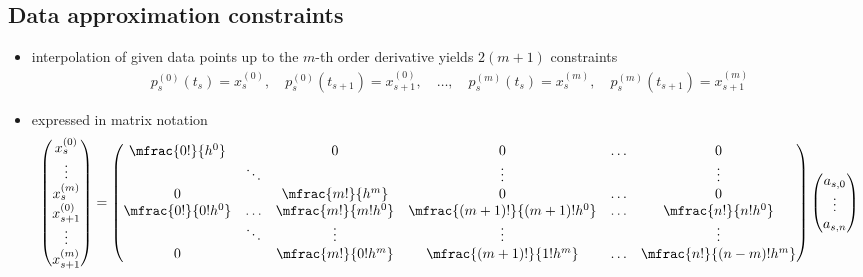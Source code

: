 \documentclass[11pt, a4paper]{article}
\begin{document}
\subsection*{Data approximation constraints}
\begin{itemize}
	\item interpolation of given data points up to the $m$-th order derivative yields ${2(m+1)}$ constraints
		\begin{align}
			p_s^{(0)}(t_s)=x_s^{(0)},\quad p_s^{(0)}(t_{s+1})=x_{s+1}^{(0)},\quad\ldots,\quad p_s^{(m)}(t_s)=x_s^{(m)},\quad p_s^{(m)}(t_{s+1})=x_{s+1}^{(m)}
		\end{align}
	\item expressed in matrix notation
		\begin{align}
			\begin{pmatrix}
				x_s^{(0)}\\
				\vdots\\
				x_s^{(m)}\\
				x_{s+1}^{(0)}\\
				\vdots\\
				x_{s+1}^{(m)}
			\end{pmatrix}
			=\begin{pmatrix}
				\mfrac{0!}{h^0}&&0&0&\hdots&0\\
				&\ddots&&\vdots&&\vdots\\
				0&&\mfrac{m!}{h^m}&0&\hdots&0\\
				\mfrac{0!}{0!h^0}&\hdots&\mfrac{m!}{m!h^0}&\mfrac{(m+1)!}{(m+1)!h^0}&\hdots&\mfrac{n!}{n!h^0}\\
				&\ddots&\vdots&\vdots&&\vdots\\
				0&&\mfrac{m!}{0!h^m}&\mfrac{(m+1)!}{1!h^m}&\hdots&\mfrac{n!}{(n-m)!h^m}
			\end{pmatrix}
			\begin{pmatrix}
				a_{s,0}\\
				\vdots\\
				a_{s,n}
			\end{pmatrix}
		\end{align}
\end{itemize}
\end{document}
